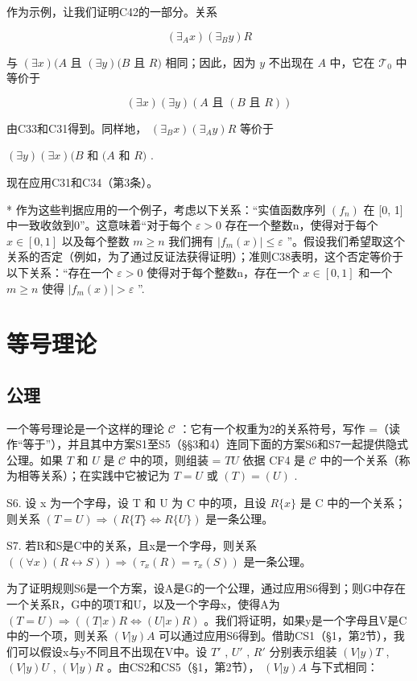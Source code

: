 作为示例，让我们证明C42的一部分。关系

\[
(\exists_ {A} x) (\exists_ {B} y) R
\]

与 \((\exists x)(A\) 且 \((\exists y)(B\) 且 \(R)\) 相同；因此，因为 \(y\) 不出现在 \(A\) 中，它在 \(\mathcal{T}_0\) 中等价于

\[
(\exists x) (\exists y) (A \text {   且   } (B \text {   且   } R))
\]

由C33和C31得到。同样地， \((\exists_{B}x)(\exists_{A}y)R\) 等价于

\((\exists y)(\exists x)(B\) 和 \((A\) 和 \(R)\) .

现在应用C31和C34（第3条）。

* 作为这些判据应用的一个例子，考虑以下关系：“实值函数序列 \((f_{n})\) 在 {[}0, 1{]}中一致收敛到0”。这意味着“对于每个 \(\varepsilon > 0\) 存在一个整数n，使得对于每个 \(x \in [0, 1]\) 以及每个整数 \(m \geqslant n\) 我们拥有 \(|f_{m}(x)| \leqslant \varepsilon\) ”。假设我们希望取这个关系的否定（例如，为了通过反证法获得证明）；准则C38表明，这个否定等价于以下关系：“存在一个 \(\varepsilon > 0\) 使得对于每个整数n，存在一个 \(x \in [0, 1]\) 和一个 \(m \geqslant n\) 使得 \(|f_{m}(x)| > \varepsilon\) ”.

\section{等号理论}

\subsection{公理}

一个等号理论是一个这样的理论 \(\mathcal{C}\) ：它有一个权重为2的关系符号，写作 =（读作“等于”），并且其中方案S1至S5（§§3和4）连同下面的方案S6和S7一起提供隐式公理。如果 \(T\) 和 \(U\) 是 \(\mathcal{C}\) 中的项，则组装 = \(TU\) 依据 CF4 是 \(\mathcal{C}\) 中的一个关系（称为相等关系）；在实践中它被记为 \(T = U\) 或 \((T) = (U)\) .

S6. 设 x 为一个字母，设 T 和 U 为 C 中的项，且设 \(R\{x\}\) 是 C 中的一个关系；则关系 \((T = U) \Longrightarrow (R\{T\} \Longleftrightarrow R\{U\})\) 是一条公理。

S7. 若R和S是C中的关系，且x是一个字母，则关系 \(((\forall x)(R \leftrightarrow S)) \Longrightarrow (\tau_{x}(R) = \tau_{x}(S))\) 是一条公理。

为了证明规则S6是一个方案，设A是G的一个公理，通过应用S6得到；则G中存在一个关系R，G中的项T和U，以及一个字母x，使得A为 \((T=U)\Longrightarrow((T|x)R\Longleftrightarrow(U|x)R)\) 。我们将证明，如果y是一个字母且V是C中的一个项，则关系 \((V|y)A\) 可以通过应用S6得到。借助CS1（§1，第2节），我们可以假设x与y不同且不出现在V中。设 \(T'\) , \(U'\) , \(R'\) 分别表示组装 \((V|y)T\) , \((V|y)U\) , \((V|y)R\) 。由CS2和CS5（§1，第2节）， \((V|y)A\) 与下式相同：

